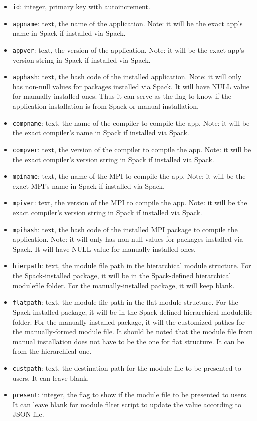 \documentclass[conference]{IEEEtran}
\begin{document}
\begin{itemize}
    \item \verb|id|: integer, primary key with autoincrement.
    \item \verb|appname|: text, the name of the application. Note: it will be the exact app's name in Spack if installed via Spack.
    \item \verb|appver|: text, the version of the application. Note: it will be the exact app's version string in Spack if installed via Spack.
    \item \verb|apphash|: text, the hash code of the installed application. Note: it will only has non-null values for packages installed via Spack. It will have NULL value for manually installed ones. Thus it can serve as the flag to know if the application installation is from Spack or manual installation.
    \item \verb|compname|: text, the name of the compiler to compile the app. Note: it will be the exact compiler's name in Spack if installed via Spack.
    \item \verb|compver|: text, the version of the compiler to compile the app. Note: it will be the exact compiler's version string in Spack if installed via Spack.
    \item \verb|mpiname|: text, the name of the MPI to compile the app. Note: it will be the exact MPI's name in Spack if installed via Spack.
    \item \verb|mpiver|: text, the version of the MPI to compile the app. Note: it will be the exact compiler's version string in Spack if installed via Spack.
    \item \verb|mpihash|: text, the hash code of the installed MPI package to compile the application. Note: it will only has non-null values for packages installed via Spack. It will have NULL value for manually installed ones. 
    \item \verb|hierpath|: text, the module file path in the hierarchical module structure. For the Spack-installed package, it will be in the Spack-defined hierarchical modulefile folder. For the manually-installed package, it will keep blank. 
    \item \verb|flatpath|: text, the module file path in the flat module structure. For the Spack-installed package, it will be in the Spack-defined hierarchical modulefile folder. For the manually-installed package, it will the customized pathes for the manually-formed module file. It should be noted that the module file from manual installation does not have to be the one for flat structure. It can be from the hierarchical one.
    \item \verb|custpath|: text, the destination path for the module file to be presented to users. It can leave blank.
    \item \verb|present|: integer, the flag to show if the module file to be presented to users. It can leave blank for module filter script to update the value according to JSON file.

\end{itemize}
\end{document}
